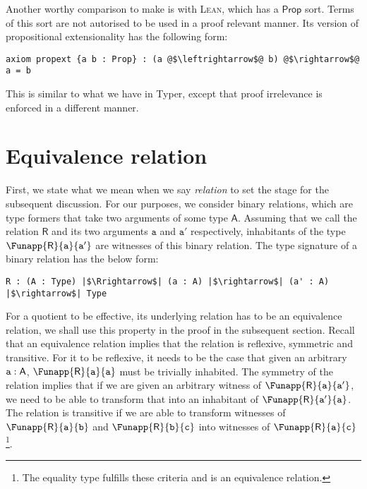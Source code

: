 \documentclass[12pt,twoside,maitrise]{dms}
\theoremstyle{definition}
\numberwithin{equation}{section}
\numberwithin{table}{chapter}
\numberwithin{figure}{chapter}
\newcommand\kw[1] {\textsf{#1}}
\newcommand\id[1] {\texttt{#1}}
\def\Lean{\textsc{Lean}\xspace}
\begin{document}
Another worthy comparison to make is with \Lean{}, which has a $\kw{Prop}$ sort.
Terms of this sort are not autorised to be used in a proof relevant manner. Its
version of propositional extensionality has the following form:

\begin{verbatim}
axiom propext {a b : Prop} : (a @$\leftrightarrow$@ b) @$\rightarrow$@ a = b
\end{verbatim}

This is similar to what we have in Typer, except that proof irrelevance is
enforced in a different manner.

\section{Equivalence relation}

First, we state what we mean when we say \emph{relation} to set the stage for
the subsequent discussion. For our purposes, we consider binary relations, which
are type formers that take two arguments of some type $\kw{A}$. Assuming that we
call the relation $\kw{R}$ and its two arguments $\id{a}$ and $\id{a}'$
respectively, inhabitants of the type $\Funapp{\kw{R}}{\id{a}}{\id{a}'}$ are
witnesses of this binary relation. The type signature of a binary relation has
the below form:

\begin{verbatim}
R : (A : Type) |$\Rrightarrow$| (a : A) |$\rightarrow$| (a' : A) |$\rightarrow$| Type
\end{verbatim}

For a quotient to be effective, its underlying relation has to be an equivalence relation, we shall use this property in the proof in the subsequent section. Recall that an equivalence relation implies that the relation is reflexive, symmetric and transitive. For it to be reflexive, it needs to be the case that given an arbitrary $\oftype{\id{a}}{\kw{A}}$, $\Funapp{\kw{R}}{\id{a}}{\id{a}}$ must be trivially inhabited. The symmetry of the relation implies that if we are given an arbitrary witness of $\Funapp{\kw{R}}{\id{a}}{\id{a}'}$, we need to be able to transform that into an inhabitant of $\Funapp{\kw{R}}{\id{a}'}{\id{a}}$. The relation is transitive if we are able to transform witnesses of $\Funapp{\kw{R}}{\id{a}}{\id{b}}$ and $\Funapp{\kw{R}}{\id{b}}{\id{c}}$ into witnesses of $\Funapp{\kw{R}}{\id{a}}{\id{c}}$\footnote{The equality type fulfills these criteria and is an equivalence relation.}.
\end{document}

